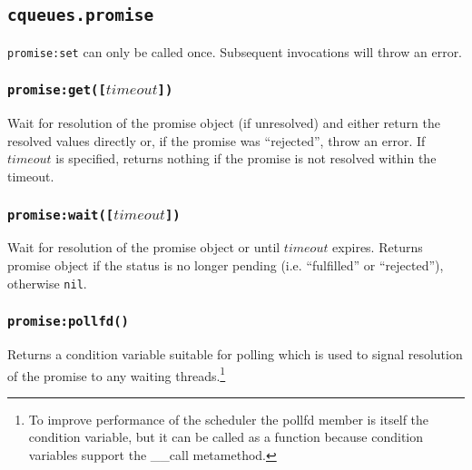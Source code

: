 \documentclass[11pt, oneside]{memoir}
\newcommand*{\fn}[1]{\texttt{#1}\xspace}
\newcommand*{\nil}[0]{\texttt{nil}\xspace}
\newcounter{toccols}
\newenvironment{Module}[1]{
	\subsection{\texttt{#1}}
	\addtocontents{toc}{
		\protect\begin{multicols}{\value{toccols}}
	}
}{
	\addtocontents{toc}{\protect\end{multicols}}
}
\begin{document}
\begin{Module}{cqueues.promise}
\fn{promise:set} can only be called once. Subsequent invocations will throw an error.

\subsubsection[\fn{promise:get}]{\fn{promise:get([$timeout$])}}

Wait for resolution of the promise object (if unresolved) and either return the resolved values directly or, if the promise was ``rejected'', throw an error. If $timeout$ is specified, returns nothing if the promise is not resolved within the timeout.

\subsubsection[\fn{promise:wait}]{\fn{promise:wait([$timeout$])}}

Wait for resolution of the promise object or until $timeout$ expires. Returns promise object if the status is no longer pending (i.e. ``fulfilled'' or ``rejected''), otherwise \nil.

\subsubsection[\fn{promise:pollfd}]{\fn{promise:pollfd()}}

Returns a condition variable suitable for polling which is used to signal resolution of the promise to any waiting threads.\footnote{To improve performance of the scheduler the pollfd member is itself the condition variable, but it can be called as a function because condition variables support the \_\_call metamethod.}

\end{Module}
\end{document}
